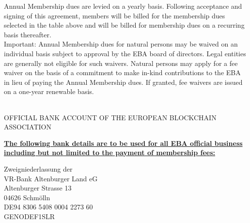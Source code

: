 \documentclass{article}
\begin{document}
Annual Membership dues are levied on a yearly basis. Following acceptance and signing of this agreement, members will be billed for the membership dues selected in the table above and will be billed for membership dues on a recurring basis thereafter.\\

Important: Annual Membership dues for natural persons may be waived on an individual basis subject to approval by the EBA board of directors. Legal entities are generally not eligible for such waivers. Natural persons may apply for a fee waiver on the basis of a commitment to make in-kind contributions to the EBA in lieu of paying the Annual Membership dues. If granted, fee waivers are issued on a one-year renewable basis.\\

  \\

\newpage

{\scshape\LARGE OFFICIAL BANK ACCOUNT OF THE EUROPEAN BLOCKCHAIN ASSOCIATION \centering \par}

\begin{center}
  \uline{\bfseries The following bank details are to be used for all EBA official business including but not limited to the payment of membership fees:}\\
\end{center}

Zweigniederlassung der\\
VR-Bank Altenburger Land eG\\
Altenburger Strasse 13\\
04626 Schmölln\\

DE94 8306 5408 0004 2273 60\\

GENODEF1SLR\\
\end{document}
